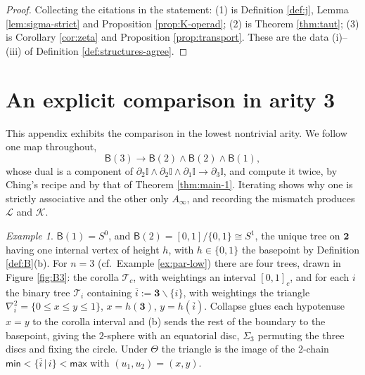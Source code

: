 \documentclass[12pt]{amsart}
\theoremstyle{definition}
\theoremstyle{remark}
\newtheorem{example}[subsection]{Example}
\newcommand{\Id}{\mathbb{I}}
\newcommand{\BC}{\mathsf{B}}                     %
\newcommand{\TreeF}{\mathcal{T}}                 %
\newcommand{\Kop}{\mathcal{K}}                   %
\newcommand{\Lop}{\mathcal{L}}                   %
\newcommand{\Thet}{\Theta}                       %
\begin{document}
\begin{proof}
Collecting the citations in the statement: (1) is Definition \ref{def:j}, Lemma \ref{lem:sigma-strict} and Proposition \ref{prop:K-operad}; (2) is Theorem \ref{thm:taut}; (3) is Corollary \ref{cor:zeta} and Proposition \ref{prop:transport}. These are the data (i)--(iii) of Definition \ref{def:structures-agree}.
\end{proof}


\section{An explicit comparison in arity 3}\label{sec:anchor-low}

This appendix exhibits the comparison in the lowest nontrivial arity. We follow one map throughout,
\[ \BC(3)\longrightarrow \BC(2)\wedge\BC(2)\wedge\BC(1),\]
whose dual is a component of $\partial_2\Id\wedge\partial_2\Id\wedge\partial_1\Id\to\partial_3\Id$, and compute it twice, by Ching's recipe and by that of Theorem \ref{thm:main-1}. Iterating shows why one is strictly associative and the other only $A_\infty$, and recording the mismatch produces $\Lop$ and $\Kop$.

\begin{example}\label{ex:B2-B3}
$\BC(1) = S^0$, and $\BC(2) = [0,1]/\{0,1\}\cong S^1$, the unique tree on $\mathbf{2}$ having one internal vertex of height $h$, with $h\in\{0,1\}$ the basepoint by Definition \ref{def:B}(b). For $n=3$ (cf.\ Example \ref{ex:par-low}) there are four trees, drawn in Figure \ref{fig:B3}: the corolla $\TreeF_c$, with weightings an interval $[0,1]_c$, and for each $i$ the binary tree $\TreeF_i$ containing $\overline{i} := \mathbf{3}\smallsetminus\{i\}$, with weightings the triangle $\nabla^2_i = \{0\leq x\leq y\leq 1\}$, $x = h(\mathbf{3})$, $y = h(\overline{i})$. Collapse glues each hypotenuse $x=y$ to the corolla interval and (b) sends the rest of the boundary to the basepoint, giving the $2$-sphere with an equatorial disc, $\Sigma_3$ permuting the three discs and fixing the circle. Under $\Thet$ the triangle is the image of the $2$-chain $\mathsf{min} < \{\overline{i}\,|\,i\} < \mathsf{max}$ with $(u_1,u_2) = (x,y)$.
\end{example}
\end{document}
